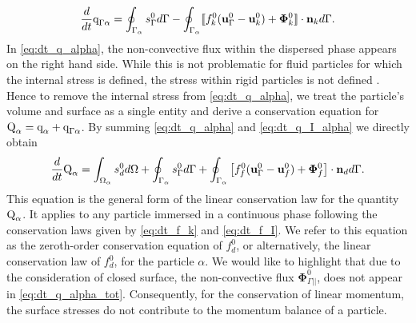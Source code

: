 \begin{equation}
    \ddt  \text q_{\Gamma\alpha}
    = \intS{ 
        s_\Gamma^0
    }
    - \intS{
 \Jump{
        f_k^0 (\textbf{u}_\Gamma^0 - \textbf{u}_k^0)
        + \mathbf{\Phi}_k^0
    }
    }.
    \label{eq:dt_q_I_alpha}
\end{equation}
In \ref{eq:dt_q_alpha}, the non-convective flux within the dispersed phase appears on the right hand side. While this is not problematic for fluid particles for which the internal stress is defined, the stress within rigid particles is not defined \citep{batchelor1970stress}.
Hence to remove the internal stress from \ref{eq:dt_q_alpha}, we treat the particle's volume and surface as a single entity and derive a conservation equation for $\text Q_\alpha = \text q_\alpha + \text q_{\Gamma\alpha}$. 
By summing \ref{eq:dt_q_alpha} and \ref{eq:dt_q_I_alpha} we directly obtain 
\begin{equation}
    \ddt  \text Q_\alpha
    = 
    \intO{ s_d^0 }
    + \intS{ s_\Gamma^0 }
    + \intS{ \left[
        f_f^0 (\textbf{u}_\Gamma^0-\textbf{u}_f^0) 
        + \mathbf{\Phi}_f^0 
        \right] \cdot \textbf{n}_d }. 
    \label{eq:dt_q_alpha_tot}
\end{equation}
This equation is the general form of the linear conservation law for the quantity $\text Q_\alpha$.
It applies to any particle immersed in a continuous phase following the conservation laws given by \ref{eq:dt_f_k} and \ref{eq:dt_f_I}.
We refer to this equation as the zeroth-order conservation equation of $f_d^0$, or alternatively, the linear conservation law of $f_d^0$, for the particle $\alpha$.
We would like to highlight that due to the consideration of closed surface, the non-convective flux $\mathbf{\Phi}_{\Gamma||}^0$, does not appear in \ref{eq:dt_q_alpha_tot}.
Consequently, for the conservation of linear momentum, the surface stresses do not contribute to the momentum balance of a particle.
